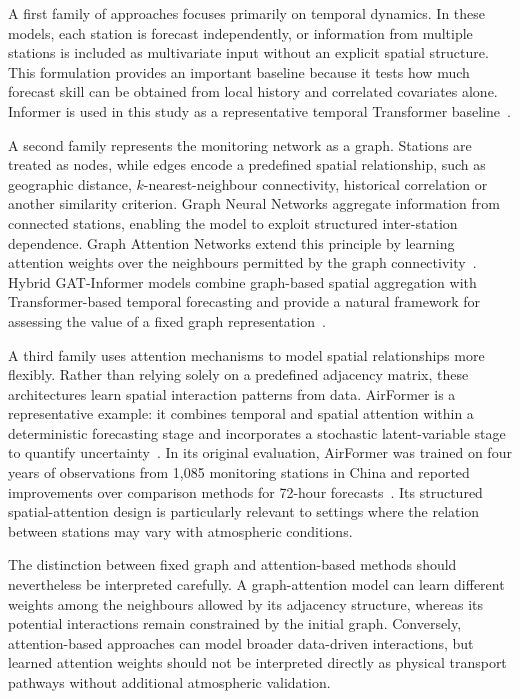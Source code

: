 \documentclass[11pt]{article}
\begin{document}
A first family of approaches focuses primarily on temporal dynamics. In these models, each station is forecast independently, or information from multiple stations is included as multivariate input without an explicit spatial structure. This formulation provides an important baseline because it tests how much forecast skill can be obtained from local history and correlated covariates alone. Informer is used in this study as a representative temporal Transformer baseline~\cite{Zhou2021Informer,Zhou2023InformerEx}.

A second family represents the monitoring network as a graph. Stations are treated as nodes, while edges encode a predefined spatial relationship, such as geographic distance, $k$-nearest-neighbour connectivity, historical correlation or another similarity criterion. Graph Neural Networks aggregate information from connected stations, enabling the model to exploit structured inter-station dependence. Graph Attention Networks extend this principle by learning attention weights over the neighbours permitted by the graph connectivity~\cite{Velickovic2018}. Hybrid GAT-Informer models combine graph-based spatial aggregation with Transformer-based temporal forecasting and provide a natural framework for assessing the value of a fixed graph representation~\cite{YU2023110864}.

A third family uses attention mechanisms to model spatial relationships more flexibly. Rather than relying solely on a predefined adjacency matrix, these architectures learn spatial interaction patterns from data. AirFormer is a representative example: it combines temporal and spatial attention within a deterministic forecasting stage and incorporates a stochastic latent-variable stage to quantify uncertainty~\cite{liang2022airformer}. In its original evaluation, AirFormer was trained on four years of observations from 1,085 monitoring stations in China and reported improvements over comparison methods for 72-hour forecasts~\cite{liang2022airformer}. Its structured spatial-attention design is particularly relevant to settings where the relation between stations may vary with atmospheric conditions.

The distinction between fixed graph and attention-based methods should nevertheless be interpreted carefully. A graph-attention model can learn different weights among the neighbours allowed by its adjacency structure, whereas its potential interactions remain constrained by the initial graph. Conversely, attention-based approaches can model broader data-driven interactions, but learned attention weights should not be interpreted directly as physical transport pathways without additional atmospheric validation.
\end{document}
